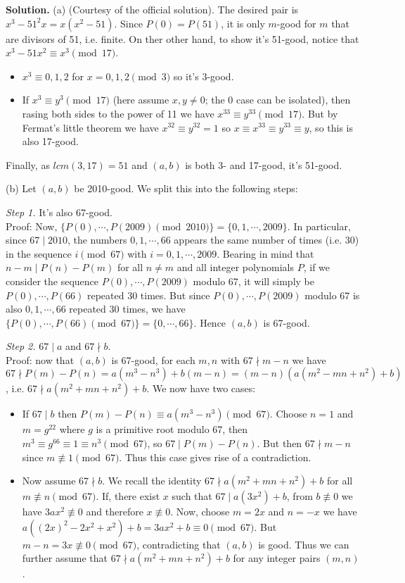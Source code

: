 \documentclass[11pt]{article}
\newcommand{\<}{\langle}
\renewcommand{\>}{\rangle}
\begin{document}
\begin{enumerate}
	\textbf{Solution.} 
	(a) (Courtesy of the official solution). The desired pair is $x^3-51^2x=x(x^2-51)$. Since $P(0)=P(51)$, it is only $m$-good for $m$ that are divisors of 51, i.e. finite. 
	On ther other hand, to show it's 51-good, notice that $x^3-51x^2\equiv x^3\pmod{17}$. 
	\begin{itemize}
		\item $x^3\equiv 0, 1, 2$ for $x=0, 1, 2\pmod{3}$ so it's 3-good. 
		\item If $x^3\equiv y^3\pmod{17}$ (here assume $x, y\neq 0$; the 0 case can be isolated), then rasing both sides to the power of 11 we have $x^{33}\equiv y^{33}\pmod{17}$. But by Fermat's little theorem we have $x^{32}\equiv y^{32}=1$ so $x\equiv x^{33}\equiv y^{33}\equiv y$, so this is also 17-good. 
	\end{itemize}
	Finally, as $lcm(3, 17)=51$ and $(a, b)$ is both 3- and 17-good, it's 51-good. 
	
	(b) Let $(a, b)$ be 2010-good. We split this into the following steps: 
	
	\emph{Step 1.} It's also 67-good. \\
	Proof: Now, $\{P(0), \cdots , P(2009) \pmod{2010}\}=\{0, 1, \cdots , 2009\}$. In particular, since $67\mid 2010$, the numbers $0, 1, \cdots , 66$ appears the same number of times (i.e. 30) in the sequence $i\pmod{67}$ with $i=0, 1, \cdots , 2009$. 
	Bearing in mind that $n-m\mid P(n)-P(m)$ for all $n\neq m$ and all integer polynomials $P$, if we consider the sequence $P(0), \cdots , P(2009)$ modulo 67, it will simply be $P(0), \cdots , P(66)$ repeated 30 times. But since $P(0), \cdots , P(2009)$ modulo 67 is also $0, 1, \cdots , 66$ repeated 30 times, we have $\{P(0), \cdots , P(66)\pmod{67}\}=\{0, \cdots, 66\}$. Hence $(a, b)$ is 67-good. 
	
	\emph{Step 2.} $67\mid a$ and $67\nmid b$. \\
	Proof: now that $(a, b)$ is 67-good, for each $m, n$ with $67\nmid m-n$ we have $67\nmid P(m)-P(n)=a(m^3-n^3)+b(m-n)=(m-n)(a(m^2-mn+n^2)+b)$, i.e. $67\nmid a(m^2+mn+n^2)+b$. We now have two cases: 
	\begin{itemize}
		\item If $67\mid b$ then $P(m)-P(n)\equiv a(m^3-n^3)\pmod{67}$. Choose $n=1$ and $m=g^{22}$ where $g$ is a primitive root modulo 67, then $m^3\equiv g^{66}\equiv 1\equiv n^3\pmod{67}$, so $67\mid P(m)-P(n)$. But then $67\nmid m-n$ since $m\not\equiv 1\pmod{67}$. Thus this case gives rise of a contradiction. 
		
		\item Now assume $67\nmid b$. We recall the identity $67\nmid a(m^2+mn+n^2)+b$ for all $m\not\equiv n\pmod{67}$. 
		If, there exist $x$ such that $67\mid a(3x^2)+b$, from $b\not\equiv 0$ we have $3ax^2\not\equiv 0$ and therefore $x\not\equiv 0$. 
		Now, choose $m=2x$ and $n=-x$ we have $a((2x)^2-2x^2+x^2)+b=3ax^2+b\equiv 0\pmod{67}$. 
		But $m-n=3x\not\equiv 0\pmod{67}$, contradicting that $(a, b)$ is good. 
		Thus we can further assume that $67\nmid a(m^2+mn+n^2)+b$ for any integer pairs $(m, n)$. 
		

\end{itemize}
\end{enumerate}
\end{document}
